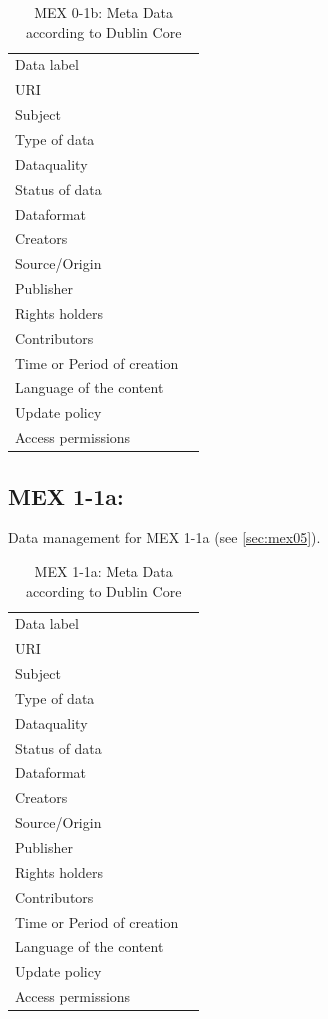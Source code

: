 \begin{table}[h!]
\caption{MEX 0-1b: Meta Data according to Dublin Core}
\label{tab:}
\small
\begin{tabular}{R{3cm}|L{7cm}}
\hline
%
Data label &  \\
URI &  \\
Subject  &  \\
Type of data  &  \\
Dataquality  &  \\
Status of data  &  \\
Dataformat  & \\
Creators  &  \\
Source/Origin &  \\
Publisher  &  \\
Rights holders &  \\
Contributors &  \\
Time or Period of creation &  \\
Language of the content &  \\
Update policy &  \\
Access permissions &  \\
%
\hline
\end{tabular}
\end{table}

\subsection{MEX 1-1a:}

Data management for MEX 1-1a (see \ref{sec:mex05}).

\begin{table}[h!]
\caption{MEX 1-1a: Meta Data according to Dublin Core}
\label{tab:}
\small
\begin{tabular}{R{3cm}|L{7cm}}
\hline
%
Data label &  \\
URI &  \\
Subject  &  \\
Type of data  &  \\
Dataquality  &  \\
Status of data  &  \\
Dataformat  & \\
Creators  &  \\
Source/Origin &  \\
Publisher  &  \\
Rights holders &  \\
Contributors &  \\
Time or Period of creation &  \\
Language of the content &  \\
Update policy &  \\
Access permissions &  \\
%
\hline
\end{tabular}
\end{table}

